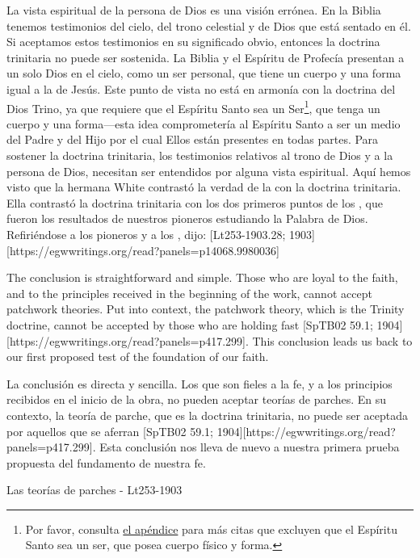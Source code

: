 La vista espiritual de la persona de Dios es una visión errónea. En la Biblia tenemos testimonios del cielo, del trono celestial y de Dios que está sentado en él. Si aceptamos estos testimonios en su significado obvio, entonces la doctrina trinitaria no puede ser sostenida. La Biblia y el Espíritu de Profecía presentan a un solo Dios en el cielo, como un ser personal, que tiene un cuerpo y una forma igual a la de Jesús. Este punto de vista no está en armonía con la doctrina del Dios Trino, ya que requiere que el Espíritu Santo sea un Ser\footnote{Por favor, consulta \hyperref[appendix:unauthenticated-reports]{el apéndice} para más citas que excluyen que el Espíritu Santo sea un ser, que posea cuerpo físico y forma.}, que tenga un cuerpo y una forma—esta idea comprometería al Espíritu Santo a ser un medio del Padre y del Hijo por el cual Ellos están presentes en todas partes. Para sostener la doctrina trinitaria, los testimonios relativos al trono de Dios y a la persona de Dios, necesitan ser entendidos por alguna vista espiritual. Aquí hemos visto que la hermana White contrastó la verdad de la  con la doctrina trinitaria. Ella contrastó la doctrina trinitaria con los dos primeros puntos de los , que fueron los resultados de nuestros pioneros estudiando la Palabra de Dios. Refiriéndose a los pioneros y a los , dijo: [Lt253-1903.28; 1903][https://egwwritings.org/read?panels=p14068.9980036]


The conclusion is straightforward and simple. Those who are loyal to the faith, and to the principles received in the beginning of the work, cannot accept patchwork theories. Put into context, the patchwork theory, which is the Trinity doctrine, cannot be accepted by those who are holding fast [SpTB02 59.1; 1904][https://egwwritings.org/read?panels=p417.299]. This conclusion leads us back to our first proposed test of the foundation of our faith.


La conclusión es directa y sencilla. Los que son fieles a la fe, y a los principios recibidos en el inicio de la obra, no pueden aceptar teorías de parches. En su contexto, la teoría de parche, que es la doctrina trinitaria, no puede ser aceptada por aquellos que se aferran [SpTB02 59.1; 1904][https://egwwritings.org/read?panels=p417.299]. Esta conclusión nos lleva de nuevo a nuestra primera prueba propuesta del fundamento de nuestra fe.





Las teorías de parches - Lt253-1903
